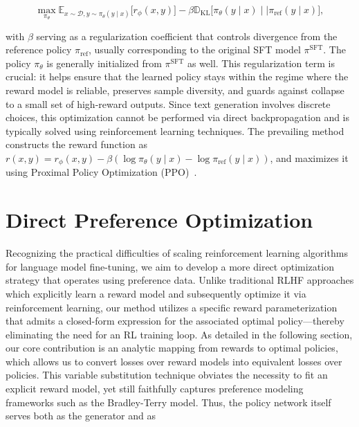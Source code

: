 \begin{equation}\label{eq:RL}
\max_{\pi_{\theta}}  \mathbb{E}_{x\sim \mathcal{D}, y\sim \pi_{\theta}(y \mid x)}\bigl[r_{\phi}(x, y)\bigr] - \beta\mathbb{D}_{\textrm{KL}}\bigl[\pi_{\theta}(y\mid x)\mid \mid \pi_\text{ref}(y\mid x)\bigr],
\end{equation}

with $\beta$ serving as a regularization coefficient that controls divergence from the reference policy $\pi_\text{ref}$, usually corresponding to the original SFT model $\pi^\text{SFT}$. The policy $\pi_\theta$ is generally initialized from $\pi^\text{SFT}$ as well. This regularization term is crucial: it helps ensure that the learned policy stays within the regime where the reward model is reliable, preserves sample diversity, and guards against collapse to a small set of high-reward outputs. Since text generation involves discrete choices, this optimization cannot be performed via direct backpropagation and is typically solved using reinforcement learning techniques. The prevailing method~\citep{ziegler2020finetuning, stiennon2022learning, bai2022training, ouyang2022training} constructs the reward function as ${r(x, y) = r_{\phi}(x, y) -\beta (\log \pi_{\theta}(y\mid x) - \log \pi_\text{ref}(y\mid x))}$, and maximizes it using Proximal Policy Optimization (PPO)~\cite{schulman2017proximal}.

\section{Direct Preference Optimization}\label{sec:DPO}

Recognizing the practical difficulties of scaling reinforcement learning algorithms for language model fine-tuning, we aim to develop a more direct optimization strategy that operates using preference data. Unlike traditional RLHF approaches which explicitly learn a reward model and subsequently optimize it via reinforcement learning, our method utilizes a specific reward parameterization that admits a closed-form expression for the associated optimal policy—thereby eliminating the need for an RL training loop. As detailed in the following section, our core contribution is an analytic mapping from rewards to optimal policies, which allows us to convert losses over reward models into equivalent losses over policies. This variable substitution technique obviates the necessity to fit an explicit reward model, yet still faithfully captures preference modeling frameworks such as the Bradley-Terry model. Thus, the policy network itself serves both as the generator and as


